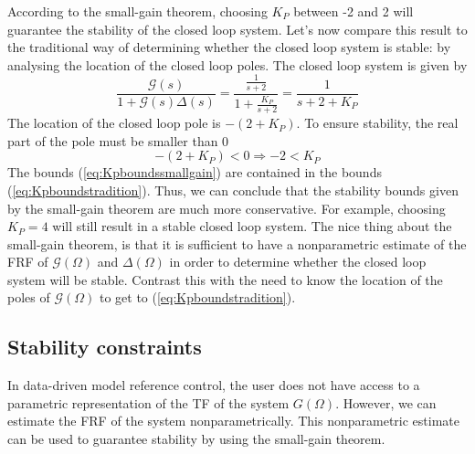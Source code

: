 According to the small-gain theorem, choosing $K_P$ between -2 and 2 will guarantee the stability of the closed loop system. Let's now compare this result to the traditional way of determining whether the closed loop system is stable: by analysing the location of the closed loop poles. The closed loop system is given by
\begin{equation*}
	\frac{\mathcal{G}(s)}{1 + \mathcal{G}(s)\Delta(s)} = \frac{\frac{1}{s+2}}{1 + \frac{K_P}{s+2}} = \frac{1}{s + 2 + K_P}
\end{equation*}
The location of the closed loop pole is $-(2+K_P)$. To ensure stability, the real part of the pole must be smaller than 0
\begin{equation}
-(2 + K_P) < 0 \Rightarrow \boxed{-2 < K_P}
\label{eq:Kpboundstradition}
\end{equation}
The bounds (\ref{eq:Kpboundssmallgain}) are contained in the bounds (\ref{eq:Kpboundstradition}). Thus, we can conclude that the stability bounds given by the small-gain theorem are much more conservative. For example, choosing $K_P=4$ will still result in a stable closed loop system. The nice thing about the small-gain theorem, is that it is sufficient to have a nonparametric estimate of the FRF of $\mathcal{G}(\Omega)$ and $\Delta(\Omega)$ in order to determine whether the closed loop system will be stable. Contrast this with the need to know the location of the poles of $\mathcal{G}(\Omega)$ to get to (\ref{eq:Kpboundstradition}).

\subsection{Stability constraints}
\label{sec:stability_constraints}
In data-driven model reference control, the user does not have access to a parametric representation of the TF of the system $G(\Omega)$. However, we can estimate the FRF of the system nonparametrically. This nonparametric estimate can be used to guarantee stability by using the small-gain theorem.


